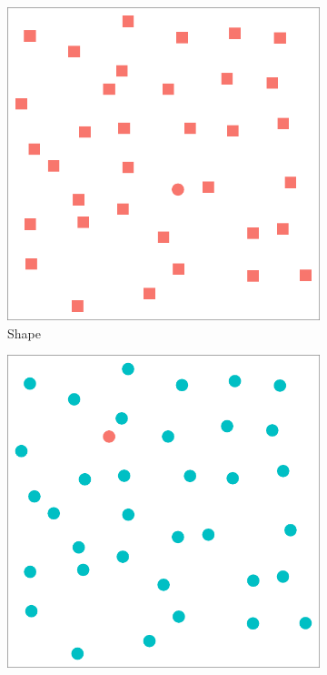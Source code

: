 \documentclass[11pt]{isuthesis}\usepackage[]{graphicx}\usepackage[]{color}
\begin{document}
\begin{figure}[htbp]\centering
\begin{subfigure}[b]{.3\textwidth}\centering
  \includegraphics[width=\textwidth]{fig-preattentive11}
  \caption{Shape}\label{fig:preattentiveshape}
\end{subfigure}\hfill
\begin{subfigure}[b]{.3\textwidth}\centering
  \includegraphics[width=\textwidth]{fig-preattentive12}

\end{subfigure}
\end{figure}
\end{document}
